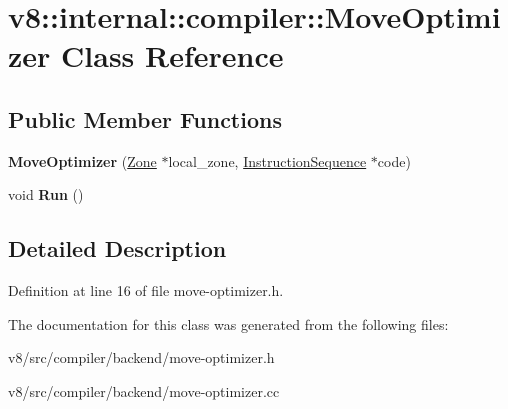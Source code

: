 \hypertarget{classv8_1_1internal_1_1compiler_1_1MoveOptimizer}{}\section{v8\+:\+:internal\+:\+:compiler\+:\+:Move\+Optimizer Class Reference}
\label{classv8_1_1internal_1_1compiler_1_1MoveOptimizer}
\subsection*{Public Member Functions}
\begin{DoxyCompactItemize}
\item 
\mbox{\label{classv8_1_1internal_1_1compiler_1_1MoveOptimizer_a9d45811f6392ec0da6197335b9dba8aa}} 
{\bfseries Move\+Optimizer} (\mbox{\hyperlink{classv8_1_1internal_1_1Zone}{Zone}} $\ast$local\+\_\+zone, \mbox{\hyperlink{classv8_1_1internal_1_1compiler_1_1InstructionSequence}{Instruction\+Sequence}} $\ast$code)
\item 
\mbox{\label{classv8_1_1internal_1_1compiler_1_1MoveOptimizer_a80cb8fa53aed4b4e7af65d13b58cf079}} 
void {\bfseries Run} ()
\end{DoxyCompactItemize}


\subsection{Detailed Description}


Definition at line 16 of file move-\/optimizer.\+h.



The documentation for this class was generated from the following files\+:\begin{DoxyCompactItemize}
\item 
v8/src/compiler/backend/move-\/optimizer.\+h\item 
v8/src/compiler/backend/move-\/optimizer.\+cc\end{DoxyCompactItemize}
